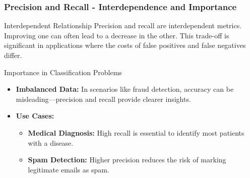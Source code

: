 \documentclass[aspectratio=169]{beamer}
\begin{document}
\begin{frame}[fragile]
    \frametitle{Precision and Recall - Interdependence and Importance}
    \begin{block}{Interdependent Relationship}
        Precision and recall are interdependent metrics. Improving one can often lead to a decrease in the other. This trade-off is significant in applications where the costs of false positives and false negatives differ.
    \end{block}

    \begin{block}{Importance in Classification Problems}
        \begin{itemize}
            \item \textbf{Imbalanced Data:} In scenarios like fraud detection, accuracy can be misleading—precision and recall provide clearer insights.
            
            \item \textbf{Use Cases:}
            \begin{itemize}
                \item \textbf{Medical Diagnosis:} High recall is essential to identify most patients with a disease.
                \item \textbf{Spam Detection:} Higher precision reduces the risk of marking legitimate emails as spam.
            \end{itemize}
        \end{itemize}
    \end{block}
\end{frame}
\end{document}
